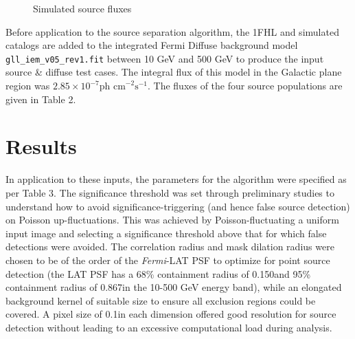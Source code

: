 \documentclass{PoS}
\begin{document}
\begin{figure}
\makeatletter
\def\@captype{table}
\makeatother
\caption{Simulated source fluxes}
\vspace{-30pt}
\end{figure}

Before application to the source separation algorithm, the 1FHL and simulated catalogs are added to the integrated Fermi Diffuse background model \verb|gll_iem_v05_rev1.fit| between 10 GeV and 500 GeV to produce the input source \& diffuse test cases. The integral flux of this model in the Galactic plane region was $2.85 \times 10^{-7} \text{ph cm}^{-2}\text{s}^{-1}$. The fluxes of the four source populations are given in Table 2.

\newpage
\section{Results}

In application to these inputs, the parameters for the algorithm were specified as per Table 3. The significance threshold was set through preliminary studies to understand how to avoid significance-triggering (and hence false source detection) on Poisson up-fluctuations. This was achieved by Poisson-fluctuating a uniform input image and selecting a significance threshold above that for which false detections were avoided. The correlation radius and mask dilation radius were chosen to be of the order of the \textit{Fermi}-LAT PSF to optimize for point source detection (the LAT PSF has a 68\% containment radius of 0.150\degree and 95\% containment radius of 0.867\degree in the 10-500 GeV energy band), while an elongated background kernel of suitable size to ensure all exclusion regions could be covered. A pixel size of 0.1\degree in each dimension offered good resolution for source detection without leading to an excessive computational load during analysis.
\end{document}
